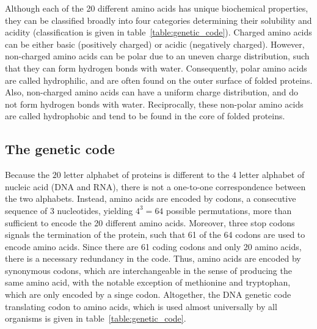 Although each of the 20 different amino acids has unique biochemical properties, they can be classified broadly into four categories determining their solubility and acidity (classification is given in table~\ref{table:genetic_code}).
Charged amino acids can be either basic (positively charged) or acidic (negatively charged).
However, non-charged amino acids can be polar due to an uneven charge distribution, such that they can form hydrogen bonds with water.
Consequently, polar amino acids are called hydrophilic, and are often found on the outer surface of folded proteins.
Also, non-charged amino acids can have a uniform charge distribution, and do not form hydrogen bonds with water.
Reciprocally, these non-polar amino acids are called hydrophobic and tend to be found in the core of folded proteins.

\subsection{The genetic code}

Because the $20$ letter alphabet of proteins is different to the $4$ letter alphabet of nucleic acid (DNA and RNA), there is not a one-to-one correspondence between the two alphabets.
Instead, amino acids are encoded by \glspl{codon}, a consecutive sequence of 3 nucleotides, yielding $4^3=64$ possible permutations, more than sufficient to encode the 20 different amino acids.
Moreover, three stop \glspl{codon} signals the termination of the protein, such that 61 of the 64 \glspl{codon} are used to encode amino acids.
Since there are 61 coding \glspl{codon} and only 20 amino acids, there is a necessary redundancy in the code.
Thus, amino acids are encoded by \gls{synonymous} \glspl{codon}, which are interchangeable in the sense of producing the same amino acid, with the notable exception of methionine and tryptophan, which are only encoded by a singe \gls{codon}.
Altogether, the \acrshort{DNA} genetic code translating \gls{codon} to amino acids, which is used almost universally by all organisms is given in table~\ref{table:genetic_code}.

